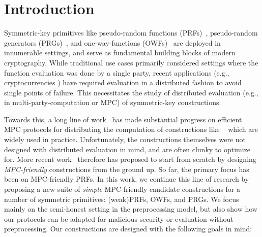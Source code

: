 
\section{Introduction}
\label{sec:introduction}



\medskip

Symmetric-key primitives like pseudo-random functions (PRFs)~\cite{goldreich1984-prf}, pseudo-random generators (PRGs)~\cite{?}, and one-way-functions (OWFs)~\cite{?} are deployed in innumerable settings, and serve as fundamental building blocks of modern cryptography. While traditional use cases primarily considered settings where the function evaluation was done by a single party, recent applications (e.g., cryptocurrencies ) have required evaluation in a distributed fashion to avoid single points of failure. This necessitates the study of distributed evaluation (e.g., in multi-party-computation or MPC) of symmetric-key constructions. 

Towards this, a long line of work~\cite{?} has made substantial progress on efficient MPC protocols for distributing the computation of constructions like ~\cite{?} which are widely used in practice. Unfortunately, the constructions themselves were not designed with distributed evaluation in mind, and are often clunky to optimize for. More recent work~\cite{grassi2016-mpcfriendly, boneh2018-darkmatter} therefore has proposed to start from scratch by designing \textit{MPC-friendly} constructions from the ground up. So far, the primary focus has been on MPC-friendly PRFs. In this work, we continue this line of research by proposing a new suite of \textit{simple} MPC-friendly candidate constructions for a number of symmetric primitives: (weak)PRFs, OWFs, and PRGs. We focus mainly on the semi-honest setting in the preprocessing model, but also show how our protocols can be adapted for malicious security or evaluation without preprocessing. Our constructions are designed with the following goals in mind:

